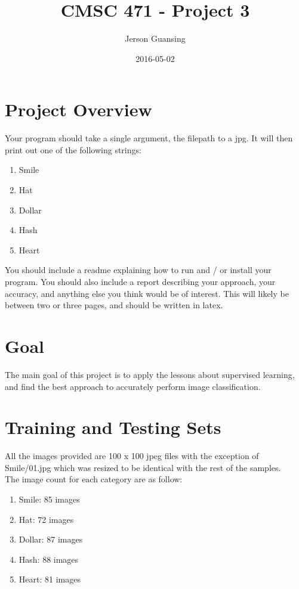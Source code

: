 \documentclass{article}
\title{CMSC 471 - Project 3}
\date{2016-05-02}
\author{Jerson Guansing}
\begin{document}
  \maketitle
  \newpage
  \tableofcontents
  \newpage

  \section{Project Overview}
  
  Your program should take a single argument, the filepath to a jpg. It will then print out one of the following strings:\\
  \begin{enumerate}
  	\item Smile
  	\item Hat
  	\item Dollar
  	\item Hash
  	\item Heart
  \end{enumerate}
  You should include a readme explaining how to run and / or install your program. You should also include a report describing your approach, your accuracy, and anything else you think would be of interest. This will likely be between two or three pages, and should be written in latex.\\
  
  \section{Goal}
  
  The main goal of this project is to apply the lessons about supervised learning, and find the best approach to accurately perform image classification.
  
  
  \section{Training and Testing Sets}
  
  All the images provided are 100 x 100 jpeg files with the exception of Smile/01.jpg which was resized to be identical with the rest of the samples.\\
  
  The image count for each category are as follow:\\
  \begin{enumerate}
  	\item Smile: 85 images
  	\item Hat: 72 images
  	\item Dollar: 87 images
  	\item Hash: 88 images
  	\item Heart: 81 images
  \end{enumerate}
  
\end{document}
